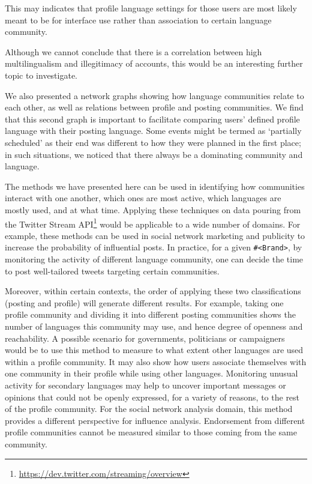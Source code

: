 \documentclass{llncs}
\begin{document}
This may indicates that profile language settings for those
users are most likely meant to be for interface use rather than association to certain
language community.

Although we cannot conclude that there is a correlation between high
multilingualism and illegitimacy of accounts, this would be an
interesting further topic to investigate.

We also presented a network graphs showing how language communities
relate to each other, as well as relations between profile and posting
communities. We find that this second graph is important to facilitate
comparing users' defined profile language with their posting
language. Some events might be termed as `partially scheduled' as
their end was different to how they were planned in the first place;
in such situations, we noticed that there always be a dominating
community and language.

The methods we have presented here can be used in identifying how
communities interact with one another, which ones are most active,
which languages are mostly used, and at what time. Applying these
techniques on data pouring from the Twitter Stream
API\footnote{\url{https://dev.twitter.com/streaming/overview}} would
be applicable to a wide number of domains. For example, these methods
can be used in social network marketing and publicity to increase the
probability of influential posts. In practice, for a given
{\texttt{\#<Brand>}}, by monitoring the activity of different language
community, one can decide the time to post well-tailored tweets
targeting certain communities.

Moreover, within certain contexts, the order of applying these two
classifications (posting and profile) will generate different results.
For example, taking one profile community and dividing it into
different posting communities shows the number of languages this
community may use, and hence degree of openness and reachability. A
possible scenario for governments, politicians or campaigners would be
to use this method to measure to what extent other languages are used
within a profile community. It may also show how users associate
themselves with one community in their profile while using other
languages. Monitoring unusual activity for secondary languages may
help to uncover important messages or opinions that could not be
openly expressed, for a variety of reasons, to the rest of the profile
community. For the social network analysis domain, this method
provides a different perspective for influence analysis. Endorsement
from different profile communities cannot be measured similar to those
coming from the same community.
\end{document}
